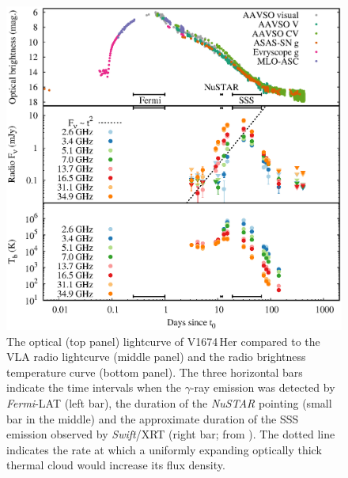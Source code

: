 \documentclass[a4paper,fleqn,usenatbib]{mnras}
\newcommand{\nova}{V1674\,Her}
\newcommand{\fermilat}{\emph{Fermi}-LAT}
\begin{document}
\begin{figure}
        \includegraphics[width=1.0\linewidth,clip=true,trim=0cm 4cm 0cm 0cm,angle=0]{lightcurve_opticalVLA.eps}
    \caption{The optical (top panel) lightcurve of \nova{} compared to the
VLA radio lightcurve (middle panel) and the radio brightness temperature curve 
(bottom panel). The three horizontal bars indicate the time intervals when 
the $\gamma$-ray emission was detected by \fermilat{} (left bar),
the duration of the {\em NuSTAR} pointing (small bar in the middle) and 
the approximate duration of the SSS emission observed by {\em Swift}/XRT
(right bar; from \citealt{2021ApJ...922L..42D}). The dotted %
line indicates 
the rate at which a uniformly expanding optically thick thermal cloud would 
increase its flux density.}
    \label{fig:vlalc}
\end{figure}
\end{document}

